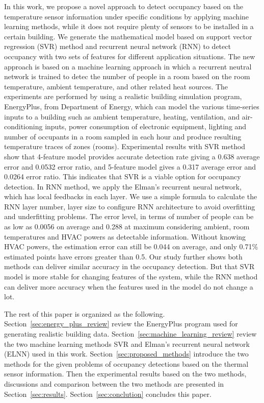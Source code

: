 In this work, we propose a novel approach to detect occupancy based on
the temperature sensor information under specific conditions by
applying machine learning methods, while it does not require plenty of
sensors to be installed in a certain building.  We generate the
mathematical model based on support vector regression (SVR) method and
recurrent neural network (RNN) to detect occupancy with two sets of
features for different application situations.  The new approach is
based on a machine learning approach in which a recurrent neutral
network is trained to detec the number of people in a room based on
the room temperature, ambient temperature, and other related heat
sources.  The experiments are performed by using a realistic building
simulation program, EnergyPlus, from Department of Energy, which can
model the various time-series inputs to a building such as ambient
temperature, heating, ventilation, and air-conditioning inputs, power
consumption of electronic equipment, lighting and number of occupants
in a room sampled in each hour and produce resulting temperature
traces of zones (rooms).  Experimental results with SVR method show
that 4-feature model provides accurate detection rate giving a 0.638
average error and 0.0532 error ratio, and 5-feature model gives a
0.317 average error and 0.0264 error ratio. This indicates that SVR is
a viable option for occupancy detection.  In RNN method, we apply the
Elman's recurrent neural network, which has local feedbacks in each
layer. We use a simple formula to calculate the RNN layer number,
layer size to configure RNN architecture to avoid overfitting and
underfitting problems. The error level, in terms of number of people
can be as low as 0.0056 on average and 0.288 at maximum considering
ambient, room temperatures and HVAC powers as detectable
information. Without knowing HVAC powers, the estimation error can
still be 0.044 on average, and only 0.71\% estimated points have
errors greater than 0.5. Our study further shows both methods can
deliver similar accuracy in the occupancy detection.  But that SVR
model is more stable for changing features of the system, while the
RNN method can deliver more accuracy when the features used in the
model do not change a lot.


The rest of this paper is organized as the following.
Section~\ref{sec:energy_plus_review} review the EnergyPlus program
used for generating realistic building
data. Section~\ref{sec:machine_learning_review} review the two machine
learning methods SVR and Elman's recurrent neural network (ELNN) used
in this work.  Section~\ref{sec:proposed_methods} introduce the two
methods for the given problems of occupancy detections based on the
thermal sensor information. Then the experimental results based on the
two methods, discussions and comparison between the two methods are
presented in Section~\ref{sec:results}. Section~\ref{sec:conclution}
concludes this paper.
